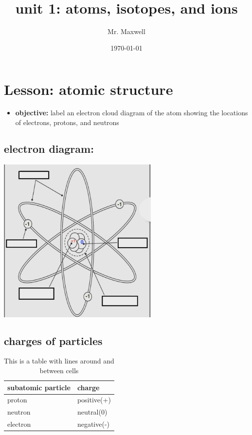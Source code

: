 \documentclass[11pt]{article}
\author{Mr. Maxwell}
\date{\today}
\title{unit 1: atoms, isotopes, and ions}
\begin{document}
\maketitle
\tableofcontents


\section{Lesson: atomic structure}
\label{sec:org9d0c192}
\begin{itemize}
\item \textbf{objective:} label an electron cloud diagram of the atom showing the locations of electrons, protons, and neutrons
\end{itemize}
\subsection{electron diagram:}
\label{sec:org0e589d7}
\begin{center}
\includegraphics[width=0.6\textwidth]{./atomNotes.png}
\end{center}


\subsection{charges of particles}
\label{sec:org2b45914}


\begin{table}[htbp]
\caption{This is a table with lines around and between cells}
\centering
\begin{tabular}{ll}
subatomic particle & charge\\[0pt]
\hline
proton & positive(+)\\[0pt]
\hline
neutron & neutral(0)\\[0pt]
\hline
electron & negative(-)\\[0pt]
\end{tabular}
\end{table}
\end{document}
